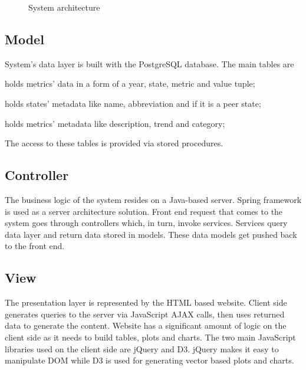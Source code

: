 		\begin{figure}[t]
			\centering
			
			\caption{System architecture}
			\label{fig:sysarch}
		\end{figure}
		
		
		\subsection{Model}
			
			System's data layer is built with the PostgreSQL database. The main tables are
			
			\begin{description}[itemsep=-1.5mm, align=right,labelwidth=3cm]
				\item [Statistics]
					holds metrics' data in a form of a year, state, metric and value tuple;
				\item [States]
					holds states' metadata like name, abbreviation and if it is a peer state;
				\item [Metrics]
					holds metrics' metadata like description, trend and category;							
			\end{description}
			
			The access to these tables is provided via stored procedures.
			
		\subsection{Controller}
		
			The business logic of the system resides on a Java-based server. Spring framework is 
			used as a server architecture solution. Front end request that comes to the system goes 
			through controllers which, in turn, invoke services. Services query data layer and return 
			data stored	in models. These data models get pushed back to the front end.
			
		\subsection{View}
			
			The presentation layer is represented by the HTML based website. Client side generates 
			queries to the server via JavaScript AJAX calls, then uses returned data to generate the content.
			Website has a significant amount of logic on the client side as it needs to build 
			tables, plots and charts. The two main JavaScript libraries used on the client side are jQuery and D3.
			jQuery makes it easy to manipulate DOM while D3 is used for generating vector based plots and charts.
			
